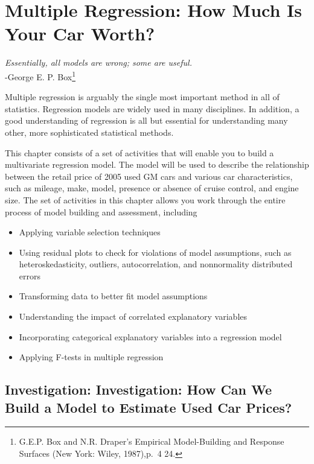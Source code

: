 \documentclass[
]{report}
\providecommand{\tightlist}{%
  \setlength{\itemsep}{0pt}\setlength{\parskip}{0pt}}
\theoremstyle{definition}
\theoremstyle{definition}
\theoremstyle{definition}
\theoremstyle{definition}
\theoremstyle{remark}
\begin{document}
\hypertarget{multiple-regression-how-much-is-your-car-worth}{%
\chapter{Multiple Regression: How Much Is Your Car Worth?}\label{multiple-regression-how-much-is-your-car-worth}}

\emph{Essentially, all models are wrong; some are useful.}\\
-George E. P. Box\footnote{G.E.P. Box and N.R. Draper's Empirical Model-Building and Response Surfaces (New York: Wiley, 1987),p.~4 24.}

Multiple regression is arguably the single most important method in all of statistics.
Regression models are widely used in many disciplines. In addition, a good understanding
of regression is all but essential for understanding many other, more sophisticated
statistical methods.

This chapter consists of a set of activities that will enable you to build a multivariate
regression model. The model will be used to describe the relationship between the retail price of 2005 used GM cars and various car characteristics, such as mileage, make, model, presence or absence of cruise control, and engine size. The set of activities in this chapter allows you work through the entire process of model building and assessment, including

\begin{itemize}
\tightlist
\item
  Applying variable selection techniques
\item
  Using residual plots to check for violations of model assumptions, such as heteroskedasticity, outliers, autocorrelation, and nonnormality distributed errors
\item
  Transforming data to better fit model assumptions
\item
  Understanding the impact of correlated explanatory variables
\item
  Incorporating categorical explanatory variables into a regression model
\item
  Applying F-tests in multiple regression
\end{itemize}

\newpage

\hypertarget{investigation-investigation-how-can-we-build-a-model-to-estimate-used-car-prices}{%
\section{Investigation: Investigation: How Can We Build a Model to Estimate Used Car Prices?}\label{investigation-investigation-how-can-we-build-a-model-to-estimate-used-car-prices}}
\end{document}
